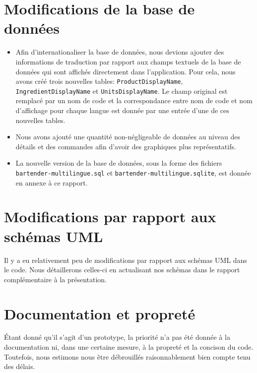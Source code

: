 \documentclass[a4paper,10pt]{article}
\begin{document}
\section{Modifications de la base de données}

\begin{itemize}
    \item Afin d'internationaliser la base de données, nous devions ajouter des informations de traduction par rapport aux champs textuels de la base de données qui sont affichés directement dans l'application. Pour cela, nous avons créé trois nouvelles tables: \texttt{ProductDisplayName}, \texttt{IngredientDisplayName} et \texttt{UnitsDisplayName}. Le champ original est remplacé par un nom de code et la correspondance entre nom de code et nom d'affichage pour chaque langue est donnée par une entrée d'une de ces nouvelles tables.
    \item Nous avons ajouté une quantité non-négligeable de données au niveau des détails et des commandes afin d'avoir des graphiques plus représentatifs.
    \item La nouvelle version de la base de données, sous la forme des fichiers \texttt{bartender-multilingue.sql} et \texttt{bartender-multilingue.sqlite}, est donnée en annexe à ce rapport.
\end{itemize}

\section{Modifications par rapport aux schémas UML}

Il y a eu relativement peu de modifications par rapport aux schémas UML dans le code. Nous détaillerons celles-ci en actualisant nos schémas dans le rapport complémentaire à la présentation.

\section{Documentation et propreté}

Étant donné qu'il s'agit d'un prototype, la priorité n'a pas été donnée à la documentation ni, dans une certaine mesure, à la propreté et la concison du code. Toutefois, nous estimons nous être débrouillés raisonnablement bien compte tenu des délais.
\end{document}
